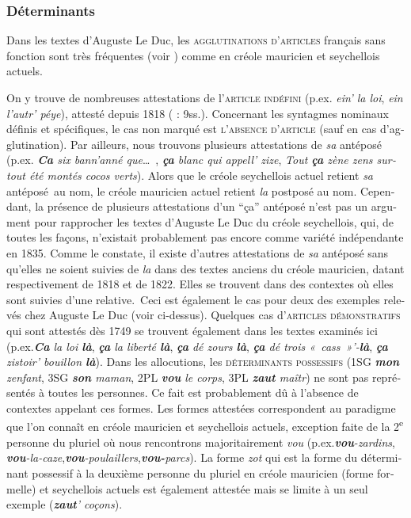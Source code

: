 \documentclass[output=paper]{langscibook}
\begin{document}
\begin{otherlanguage}{french}
\subsubsection{Déterminants}

Dans les textes d’Auguste Le Duc, les \textsc{agglutinations d’articles} français sans fonction sont très fréquentes (voir ) comme en créole mauricien et seychellois actuels.

On y trouve de nombreuses attestations de l’\textsc{article indéfini} (p.ex. \textit{ein’ la loi}, \textit{ein l’autr’ péye}), attesté depuis 1818 (\citealt{BakerEtAl2007} : 9ss.). Concernant les syntagmes nominaux définis et spécifiques, le cas non marqué est \textsc{l’absence d’article} (sauf en cas d’agglutination). Par ailleurs, nous trouvons plusieurs attestations de \textit{sa} antéposé (p.ex. \textit{\textbf{Ca} six bann’anné que}…~, \textit{\textbf{ça} blanc qui appell’ zize}, \textit{Tout \textbf{ça} zène zens surtout été montés cocos verts}). Alors que le créole seychellois actuel retient \textit{sa} antéposé~au nom, le créole mauricien actuel retient \textit{la} postposé au nom. Cependant, la présence de plusieurs attestations d’un “ça” antéposé n’est pas un argument pour rapprocher les textes d’Auguste Le Duc du créole seychellois, qui, de toutes les façons, n’existait probablement pas encore comme variété indépendante en 1835. Comme \citet[66]{Guillemin2007} le constate, il existe d’autres attestations de \textit{sa} antéposé sans qu'elles ne soient suivies de \textit{la} dans des textes anciens du créole mauricien, datant respectivement de 1818 et de 1822. Elles se trouvent dans des contextes où elles sont suivies d’une relative.~Ceci est également le cas pour deux des exemples relevés chez Auguste Le Duc (voir ci-dessus). Quelques cas d’\textsc{articles démonstratifs} qui sont attestés dès 1749 \citep[66]{Guillemin2007} se trouvent également dans les textes examinés ici (p.ex.\textit{\textbf{Ca} la loi \textbf{là}}, \textit{\textbf{ça} la liberté \textbf{là}}, \textit{\textbf{ça} dé zours \textbf{là}}, \textit{\textbf{ça} dé trois «~cass~»’-\textbf{là}}, \textit{\textbf{ça} zistoir’ bouillon \textbf{là}}). Dans les allocutions, les \textsc{déterminants possessifs} (1SG\textit{ \textbf{mon} zenfant}, 3SG \textit{\textbf{son} maman}, 2PL \textit{\textbf{vou} le corps}, 3PL \textit{\textbf{zaut} maîtr}) ne sont pas représentés à toutes les personnes. Ce fait est probablement dû à l’absence de contextes appelant ces formes. Les formes attestées correspondent au paradigme que l’on connaît en créole mauricien et seychellois actuels, exception faite de la 2\textsuperscript{e} personne du pluriel où nous rencontrons majoritairement \textit{vou} (p.ex.\textit{\textbf{vou}\textit{-}zardins}, \textit{\textbf{vou}\textit{-}la-caze},\textit{\textbf{vou}\textit{-}poulaillers},\textit{\textbf{vou-}parcs}). La forme \textit{zot} qui est la forme du déterminant possessif à la deuxième personne du pluriel en créole mauricien (forme formelle) et seychellois actuels est également attestée mais se limite à un seul exemple (\textit{\textbf{zaut}\textit{’} coçons}). 


\end{otherlanguage}
\end{document}
